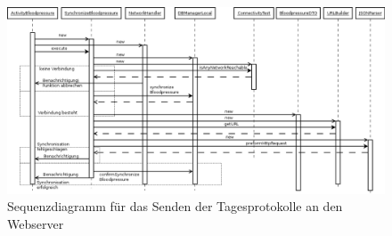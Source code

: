 \begin{figure}[h]
  \centering
  \includegraphics[scale=0.36]{diagramme/kapitel4/sequenzdiagramme/data_sync.png}
  \caption{Sequenzdiagramm f\"ur das Senden der Tagesprotokolle an den Webserver}
  
\end{figure}

